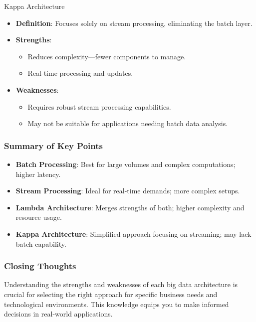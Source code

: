 \documentclass[aspectratio=169]{beamer}
\begin{document}
\begin{frame}[fragile]
    \begin{block}{Kappa Architecture}
        \begin{itemize}
            \item \textbf{Definition}: Focuses solely on stream processing, eliminating the batch layer.
            \item \textbf{Strengths}:
                \begin{itemize}
                    \item Reduces complexity—fewer components to manage.
                    \item Real-time processing and updates.
                \end{itemize}
            \item \textbf{Weaknesses}:
                \begin{itemize}
                    \item Requires robust stream processing capabilities.
                    \item May not be suitable for applications needing batch data analysis.
                \end{itemize}
        \end{itemize}
    \end{block}
\end{frame}

\begin{frame}[fragile]
    \frametitle{Summary of Key Points}
    \begin{itemize}
        \item \textbf{Batch Processing}: Best for large volumes and complex computations; higher latency.
        \item \textbf{Stream Processing}: Ideal for real-time demands; more complex setups.
        \item \textbf{Lambda Architecture}: Merges strengths of both; higher complexity and resource usage.
        \item \textbf{Kappa Architecture}: Simplified approach focusing on streaming; may lack batch capability.
    \end{itemize}
\end{frame}

\begin{frame}[fragile]
    \frametitle{Closing Thoughts}
    Understanding the strengths and weaknesses of each big data architecture is crucial for selecting the right approach for specific business needs and technological environments. This knowledge equips you to make informed decisions in real-world applications.
\end{frame}
\end{document}

